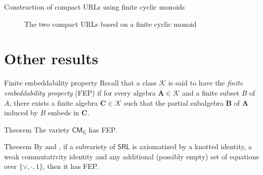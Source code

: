 \documentclass[professionalfont, handout, 12pt]{beamer} %
\theoremstyle{plain}
\theoremstyle{definition}
\newcommand{\m}[1]{{\mathbf {#1} }}
\begin{document}
\begin{frame}{Construction of compact URLs using finite cyclic monoids}
\begin{figure}
{
}
\caption{The two compact URLs based on a finite cyclic monoid}
\end{figure}
\end{frame}

\section{Other results}

\begin{frame}{Finite embeddability property}
    Recall that a class $\mathcal{K}$ is said to have the \emph{finite embeddability property} (FEP) if for every algebra $\m A \in \mathcal{K}$ and a finite subset $B$ of $A$, there exists a finite algebra $\m C \in \mathcal{K}$ such that the partial subalgebra $\m B$ of $\m A$ induced by $B$ embeds in $\m C$.\pause
    \medskip

    \begin{block}{Theorem}
        The variety $\mathsf{CM_G}$ has FEP.
    \end{block}
    \pause
    \medskip

    \begin{block}{Theorem}
        By \cite{galatos2013residuated} and \cite{cardona2017fep}, if a subvariety of $\mathsf{SRL}$ is axiomatized by a knotted identity, a weak commutativity identity and any additional (possibly empty) set of equations over $\{\vee, \cdot, 1 \}$, then it has FEP.
    \end{block}
\end{frame}

\begin{comment}
\begin{frame}{}
    An equation is called \emph{knotted} if it is of the form $x^m \leq x^n$, where $n \not = m$.
    Also, we consider the following weak versions of commutativity.
    For every $n \in \mathbb{Z}^+$ and non-constant \emph{partition} $a$ of $n+1$ (i.e., $a = (a_0, a_1, \ldots, a_n)$, where $a_0 + a_1 + \dots + a_n = n+1$ and not all $a_i$'s are $1$), we consider the ($n+1$)-variable identity ($a$):
    $$xy_1 xy_2 \cdots y_n x = x^{a_0} y_1 x^{a_1} y_2 \cdots y_n x^{a_n}.$$
    We call all of these identities \emph{weak commutativity} identities.\pause

    \begin{block}{Theorem}
        By \cite{galatos2013residuated} and \cite{cardona2017fep}, if a subvariety of $\mathsf{SRL}$ is axiomatized by a knotted identity, a weak commutativity identity and any additional (possibly empty) set of equations over $\{\vee, \cdot, 1 \}$, then it has FEP.
    \end{block}
\end{frame}
\end{comment}
\end{document}
